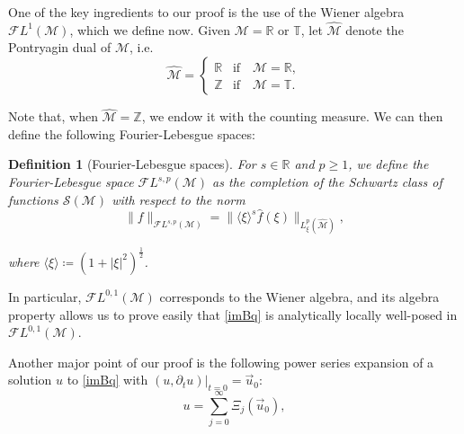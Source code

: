 \documentclass[letterpaper, 11pt,  reqno]{amsart}
\newtheorem{definition}[theorem]{Definition}
\newcommand{\1}{\hspace{0.5mm}\text{I}\hspace{0.5mm}}
\newcommand{\noi}{\noindent}
\newcommand{\Z}{\mathbb{Z}}
\newcommand{\R}{\mathbb{R}}
\newcommand{\T}{\mathbb{T}}
\newcommand{\M}{\mathcal{M}}
\newcommand{\FL}{\mathcal{F}L} %
\newcommand{\s}{\sigma}
\newcommand{\dt}{\partial_t}
\newcommand{\jb}[1]
{\langle #1 \rangle}
\numberwithin{equation}{section}
\numberwithin{theorem}{section}
\newcommand{\abs}[1]{\lvert#1\rvert}
\begin{document}



One of the key ingredients to our proof is the use of the Wiener algebra $\FL^1 (\M)$, which we define now. Given $\M = \R$ or $\T$, let $\widehat{\M}$ denote the Pontryagin dual of $\M$, i.e.
\begin{equation}
\label{DEF:PontryaginDual}
\widehat{\M} = 
\begin{cases}
\R & \text{if} \quad \M = \R, \\
\Z & \text{if} \quad \M = \T.
\end{cases}
\end{equation}

\noi Note that, when $\widehat{\M} = \Z$, we endow it with the counting measure. We can then define the following Fourier-Lebesgue spaces:

\begin{definition}[Fourier-Lebesgue spaces] \rm
\label{DEF:FLspaces}
For $s \in \R$ and $p \geq 1$, we define the Fourier-Lebesgue space $\FL^{s,p} (\M)$ as the completion of the Schwartz class of functions $\mathcal{S} ( \M)$ with respect to the norm
$$
\| f \|_{\FL^{s,p}(\M)} = \| \jb{\xi}^s \widehat{f}(\xi) \|_{L^p_\xi (\widehat{\M})},
$$

\noi where $\jb{\xi} \coloneqq (1 + \abs{\xi}^2 )^{\frac 12}$.
\end{definition}

\noi In particular, $\FL^{0,1}(\M)$ corresponds to the Wiener algebra, and its algebra property allows us to prove easily that \eqref{imBq} is analytically locally well-posed in $\FL^{0,1}(\M)$.

Another major point of our proof is the following power series expansion of a solution $u$ to \eqref{imBq} with $(u, \dt u ) |_{t=0} = \vec{u}_0$:
$$
u = \sum^\infty_{j=0} \Xi_j (\vec{u}_0 ),
$$
\end{document}
